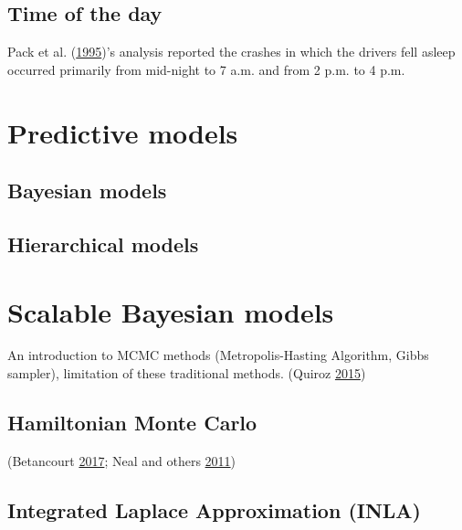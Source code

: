 \documentclass[12pt]{book}
\numberwithin{equation}{chapter}
\begin{document}
\hypertarget{time-of-the-day}{%
\subsection{Time of the day}\label{time-of-the-day}}

Pack et al. (\protect\hyperlink{ref-pack1995characteristics}{1995})'s analysis reported the crashes in which the drivers fell asleep occurred primarily from mid-night to 7 a.m. and from 2 p.m. to 4 p.m.

\hypertarget{predictive-models}{%
\section{Predictive models}\label{predictive-models}}

\hypertarget{bayesian-models}{%
\subsection{Bayesian models}\label{bayesian-models}}

\hypertarget{hierarchical-models}{%
\subsection{Hierarchical models}\label{hierarchical-models}}

\hypertarget{scalable-bayesian-models}{%
\section{Scalable Bayesian models}\label{scalable-bayesian-models}}

An introduction to MCMC methods (Metropolis-Hasting Algorithm, Gibbs sampler), limitation of these traditional methods. (Quiroz \protect\hyperlink{ref-quiroz2015bayesian}{2015})

\hypertarget{hamiltonian-monte-carlo}{%
\subsection{Hamiltonian Monte Carlo}\label{hamiltonian-monte-carlo}}

(Betancourt \protect\hyperlink{ref-betancourt2017conceptual}{2017}; Neal and others \protect\hyperlink{ref-neal2011mcmc}{2011})

\hypertarget{integrated-laplace-approximation-inla}{%
\subsection{Integrated Laplace Approximation (INLA)}\label{integrated-laplace-approximation-inla}}
\end{document}
